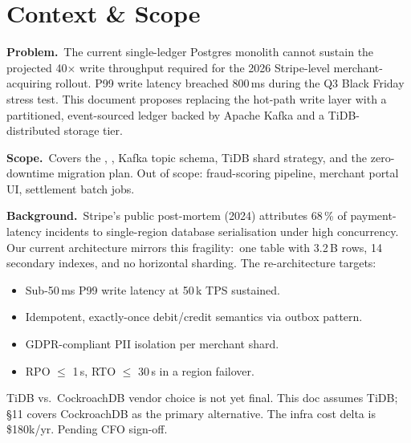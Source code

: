 \section{Context \& Scope}

\begin{contextbox}
\textbf{Problem.}\ The current single-ledger Postgres monolith cannot sustain
the projected 40$\times$ write throughput required for the 2026 Stripe-level
merchant-acquiring rollout. P99 write latency breached 800\,ms during the Q3
Black Friday stress test. This document proposes replacing the hot-path write
layer with a partitioned, event-sourced ledger backed by Apache Kafka and a
TiDB-distributed storage tier.

\vspace{4pt}
\textbf{Scope.}\ Covers the , ,
Kafka topic schema, TiDB shard strategy, and the zero-downtime migration plan.
Out of scope: fraud-scoring pipeline, merchant portal UI, settlement batch jobs.
\end{contextbox}

\vspace{6pt}

\textbf{Background.}\ Stripe's public post-mortem (2024) attributes 68\,\% of
payment-latency incidents to single-region database serialisation under high
concurrency. Our current architecture mirrors this fragility:\ one
 table with 3.2\,B rows, 14 secondary indexes, and
no horizontal sharding. The re-architecture targets:

\begin{itemize}
  \item Sub-50\,ms P99 write latency at 50\,k TPS sustained.
  \item Idempotent, exactly-once debit/credit semantics via outbox pattern.
  \item GDPR-compliant PII isolation per merchant shard.
  \item RPO $\leq$ 1\,s, RTO $\leq$ 30\,s in a region failover.
\end{itemize}

\vspace{4pt}

\begin{warnbox}
TiDB vs.\ CockroachDB vendor choice is not yet final.
This doc assumes TiDB; \S11 covers CockroachDB as the primary alternative.
The infra cost delta is \$180k/yr. Pending CFO sign-off.
\end{warnbox}

